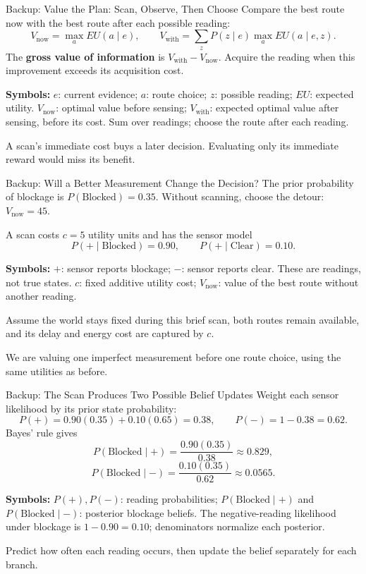 \documentclass[aspectratio=169,10pt]{beamer}
\newcommand{\equationlegend}[1]{%
  \par\smallskip
  \begingroup
    \setlength{\fboxsep}{4pt}%
    \noindent\colorbox{DeckSoft}{%
      \parbox{\dimexpr\linewidth-2\fboxsep\relax}{%
        \footnotesize\textbf{Symbols:} #1%
      }%
    }\par
  \endgroup
  \smallskip
}
\begin{document}
\begin{frame}[t]{Backup: Value the Plan: Scan, Observe, Then Choose}
  \small
  Compare the best route now with the best route after each possible reading:
  \[
    V_{\text{now}}=\max_a EU(a\mid e),\qquad
    V_{\text{with}}=\sum_z P(z\mid e)\max_a EU(a\mid e,z).
  \]
  The \textbf{gross value of information} is $V_{\text{with}}-V_{\text{now}}$.
  Acquire the reading when this improvement exceeds its acquisition cost.
  \equationlegend{$e$: current evidence; $a$: route choice; $z$: possible reading; $EU$: expected utility. $V_{\text{now}}$: optimal value before sensing; $V_{\text{with}}$: expected optimal value after sensing, before its cost. Sum over readings; choose the route after each reading.}
  \begin{keyidea}
    A scan's immediate cost buys a later decision. Evaluating only its immediate reward would miss its benefit.
  \end{keyidea}
\end{frame}

\begin{frame}[t]{Backup: Will a Better Measurement Change the Decision?}
  \small
  The prior probability of blockage is $P(\text{Blocked})=0.35$.
  Without scanning, choose the detour: $V_{\text{now}}=45$.

  A scan costs $c=5$ utility units and has the sensor model
  \[
    P(+\mid\text{Blocked})=0.90,\qquad P(+\mid\text{Clear})=0.10.
  \]
  \equationlegend{$+$: sensor reports blockage; $-$: sensor reports clear. These are readings, not true states. $c$: fixed additive utility cost; $V_{\text{now}}$: value of the best route without another reading.}
  Assume the world stays fixed during this brief scan, both routes remain available, and its delay and energy cost are captured by $c$.
  \begin{keyidea}
    We are valuing one imperfect measurement before one route choice, using the same utilities as before.
  \end{keyidea}
\end{frame}

\begin{frame}[t]{Backup: The Scan Produces Two Possible Belief Updates}
  \small
  Weight each sensor likelihood by its prior state probability:
  \[
    P(+)=0.90(0.35)+0.10(0.65)=0.38,\qquad P(-)=1-0.38=0.62.
  \]
  Bayes' rule gives
  \[
    P(\text{Blocked}\mid+)=\frac{0.90(0.35)}{0.38}\approx0.829,
  \]
  \[
    P(\text{Blocked}\mid-)=\frac{0.10(0.35)}{0.62}\approx0.0565.
  \]
  \equationlegend{$P(+),P(-)$: reading probabilities; $P(\text{Blocked}\mid+)$ and $P(\text{Blocked}\mid-)$: posterior blockage beliefs. The negative-reading likelihood under blockage is $1-0.90=0.10$; denominators normalize each posterior.}
  \begin{keyidea}
    Predict how often each reading occurs, then update the belief separately for each branch.
  \end{keyidea}
\end{frame}
\end{document}

